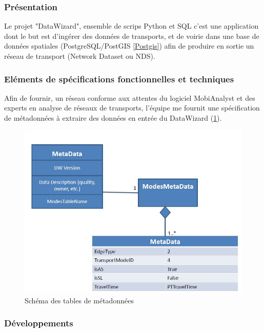 \begin{itemize}
\subsubsection{Présentation}

Le projet "DataWizard", ensemble de scrips Python et SQL c'est une application dont le but est d'ingérer des données de transports, et de voirie dans une base de données spatiales (PostgreSQL/PostGIS \ref{Postgis}) afin de produire en sortie un réseau de transport (Network Dataset ou NDS).\\


\subsubsection{Eléments de spécifications fonctionnelles et techniques}

Afin de fournir, un réseau conforme aux attentes du logiciel MobiAnalyst et des experts en analyse de réseaux de transports, l'équipe me fournit une spécification de métadonnées à extraire des données en entrée du DataWizard (\ref{DW_Metadata}).\\

\begin{figure}[!h]
\centering
\includegraphics[width=14cm]{images/DW_specMetadata.JPG}
\caption{\label{DW_Metadata}Schéma des tables de métadonnées}
\end{figure} 

\subsubsection{Développements}


\end{itemize}
